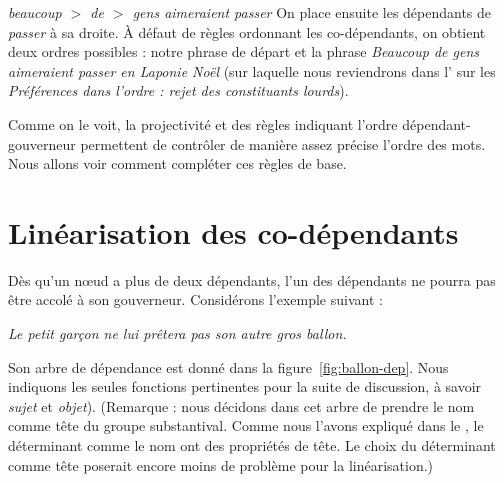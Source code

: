 \ea
    \textit{{beaucoup $>$ de $>$ gens aimeraient passer}}
\z
On place ensuite les dépendants de \textit{passer} à sa droite. À défaut de règles ordonnant les co-dépendants, on obtient deux ordres possibles : notre phrase de départ et la phrase \textit{Beaucoup de gens aimeraient passer en Laponie Noël} (sur laquelle nous reviendrons dans l’ sur les \textit{Préférences dans l’ordre : rejet des constituants lourds}).

Comme on le voit, la projectivité et des règles indiquant l’ordre dépendant-gouverneur permettent de contrôler de manière assez précise l’ordre des mots. Nous allons voir comment compléter ces règles de base.

\section{Linéarisation des co-dépendants}\label{sec:3.5.19}

Dès qu’un nœud a plus de deux dépendants, l’un des dépendants ne pourra pas être accolé à son gouverneur. Considérons l’exemple suivant :

\ea\label{ex:ballon}
\textit{{Le petit garçon ne lui prêtera pas son autre gros ballon}.}
\z

Son arbre de dépendance est donné dans la figure~\ref{fig:ballon-dep}. Nous indiquons les seules fonctions pertinentes pour la suite de discussion, à savoir \textit{sujet} et \textit{objet}).
 (Remarque : nous décidons dans cet arbre de prendre le nom comme tête du groupe substantival. Comme nous l’avons expliqué dans le , le déterminant comme le nom ont des propriétés de tête. Le choix du déterminant comme tête poserait encore moins de problème pour la linéarisation.)

